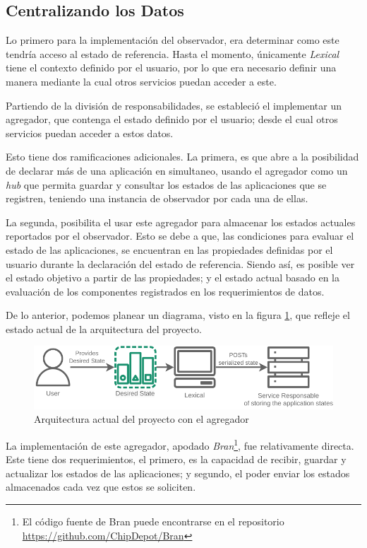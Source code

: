 \subsection{Centralizando los Datos} \label{sec:Centering}

Lo primero para la implementación del observador, era determinar como este tendría acceso al estado de referencia. Hasta el momento, únicamente \textit{Lexical} tiene el contexto definido por el usuario, por lo que era necesario definir una manera mediante la cual otros servicios puedan acceder a este.

Partiendo de la división de responsabilidades, se estableció el implementar un agregador, que contenga el estado definido por el usuario; desde el cual otros servicios puedan acceder a estos datos. 

Esto tiene dos ramificaciones adicionales. La primera, es que abre a la posibilidad de declarar más de una aplicación en simultaneo, usando el agregador como un \textit{hub} que permita guardar y consultar los estados de las aplicaciones que se registren, teniendo una instancia de observador por cada una de ellas.

La segunda, posibilita el usar este agregador para almacenar los estados actuales reportados por el observador. Esto se debe a que, las condiciones para evaluar el estado de las aplicaciones, se encuentran en las propiedades definidas por el usuario durante la declaración del estado de referencia. Siendo así, es posible ver el estado objetivo a partir de las propiedades; y el estado actual basado en la evaluación de los componentes registrados en los requerimientos de datos.

De lo anterior, podemos planear un diagrama, visto en la figura \ref{fig:StarDuckMini}, que refleje el estado actual de la arquitectura del proyecto.

\begin{figure}[ht]
    \centering
    \caption{Arquitectura actual del proyecto con el agregador}
    \label{fig:StarDuckMini}
    \includegraphics[width=0.9\linewidth]{images/StarDuckMini.pdf}
\end{figure}

La implementación de este agregador, apodado \textit{Bran}\footnote{El código fuente de Bran puede encontrarse en el repositorio \url{https://github.com/ChipDepot/Bran}}, fue relativamente directa. Este tiene dos requerimientos, el primero, es la capacidad de recibir, guardar y actualizar los estados de las aplicaciones; y segundo, el poder enviar los estados almacenados cada vez que estos se soliciten.


